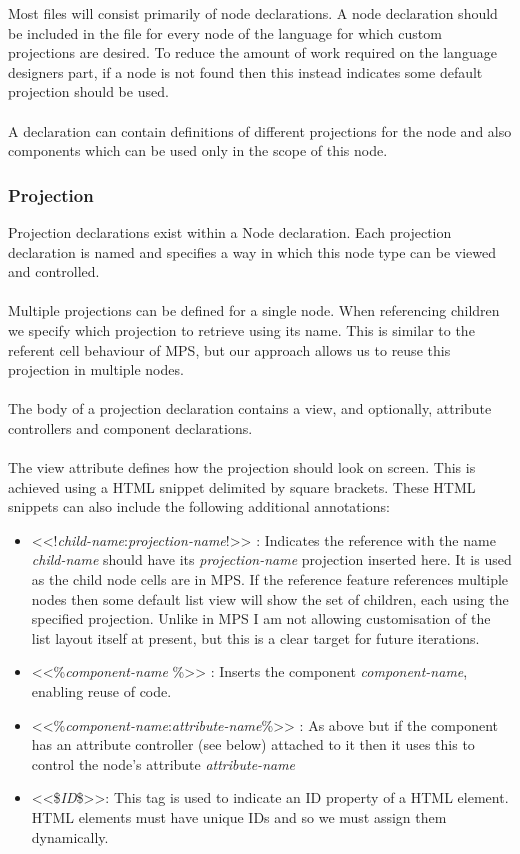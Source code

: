 \documentclass{article}
\begin{document}
{Most files will consist primarily of node declarations. A node declaration should be included in the file for every node of the language for which custom projections are desired. To reduce the amount of work required on the language designers part, if a node is not found then this instead indicates some default projection should be used.  
\\
\\
A declaration can contain definitions of different projections for the node and also components which can be used only in the scope of this node.

\subsubsection{Projection}
Projection declarations exist within a Node declaration. Each projection declaration is named and specifies a way in which this node type can be viewed and controlled.
\\
\\
Multiple projections can be defined for a single node. When referencing children we specify which projection to retrieve using its name. This is similar to the referent cell behaviour of MPS, but our approach allows us to reuse this projection in multiple nodes.
\\
\\
The body of a projection declaration contains a view, and optionally, attribute controllers and component declarations.
\\
\\
The view attribute defines how the projection should look on screen. This is achieved using a HTML snippet delimited by square brackets. These HTML snippets can also include the following additional annotations:
\begin{itemize}
\item <<!\emph{child-name}:\emph{projection-name}!>> : Indicates the reference with the name \emph{child-name} should have its \emph{projection-name} projection inserted here. It is used as the child node cells are in MPS. If the reference feature references multiple nodes then some default list view will show the set of children, each using the specified projection. Unlike in MPS I am not allowing customisation of the list layout itself at present, but this is a clear target for future iterations.
\item <<\%\emph{component-name} \%>> : Inserts the component \emph{component-name}, enabling reuse of code.
\item <<\%\emph{component-name}:\emph{attribute-name}\%>> : As above but if the component has an attribute controller (see below) attached to it then it uses this to control the node's attribute \emph{attribute-name}
\item <<\$\emph{ID}\$>>: This tag is used to indicate an ID property of a HTML element. HTML elements must have unique IDs and so we must assign them dynamically.
\end{itemize}

}
\end{document}

